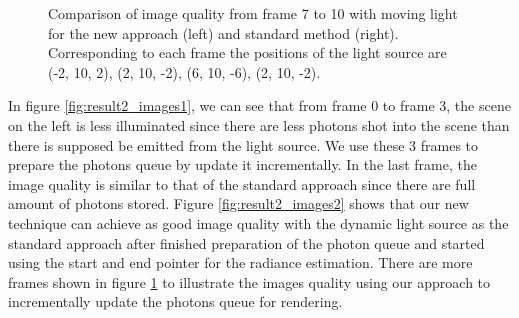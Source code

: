 \begin{figure}
\begin{center}
{\begin{tabular}{c}
\end{tabular}
}%
\renewcommand{\thefigure}{\thechapter.\arabic{figure}}
\caption[Comparison of image quality from frame 7 to 10 with moving light]{Comparison of image quality from frame 7 to 10 with moving light for the new approach (left) and standard method (right). Corresponding to each frame the positions of the light source are (-2, 10, 2), (2, 10, -2), (6, 10, -6), (2, 10, -2). }
\label{fig:result2_images3}
\end{center}
\end{figure}

In figure \ref{fig:result2_images1}, we can see that from frame 0 to frame 3, the scene on the left is less illuminated since there are less photons shot into the scene than there is supposed be emitted from the light source. We use these 3 frames to prepare the photons queue by update it incrementally. In the last frame, the image quality is similar to that of the standard approach since there are full amount of photons stored. Figure \ref{fig:result2_images2} shows that our new technique can achieve as good image quality with the dynamic light source as the standard approach after finished preparation of the photon queue and started using the start and end pointer for the radiance estimation. There are more frames shown in figure \ref{fig:result2_images3} to illustrate the images quality using our approach to incrementally update the photons queue for rendering. 




